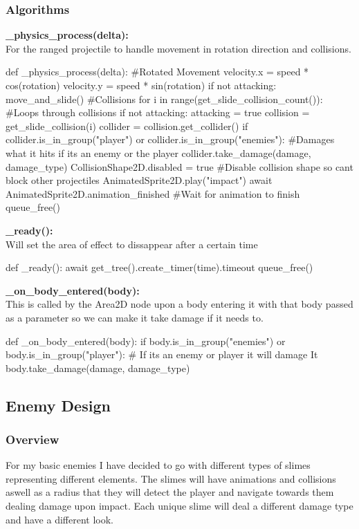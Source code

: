 \documentclass{article}
\begin{document}
        \subsubsection{Algorithms}
        \textbf{\_physics\_process(delta):}\\
        For the ranged projectile to handle movement in rotation direction and collisions.\\
        \begin{python}
def _physics_process(delta):
   #Rotated Movement
   velocity.x = speed * cos(rotation)
   velocity.y = speed * sin(rotation)
   if not attacking:
      move_and_slide()
   #Collisions
   for i in range(get_slide_collision_count()): #Loops through collisions
      if not attacking:
         attacking = true
         collision = get_slide_collision(i)
         collider = collision.get_collider()
         if collider.is_in_group("player") or collider.is_in_group("enemies"): #Damages what it hits if its an enemy or the player
            collider.take_damage(damage, damage_type) 
         CollisionShape2D.disabled = true #Disable collision shape so cant block other projectiles
         AnimatedSprite2D.play("impact")
         await AnimatedSprite2D.animation_finished #Wait for animation to finish
         queue_free()
        \end{python}
        \textbf{\_ready():}\\
        Will set the area of effect to dissappear after a certain time
        \begin{python}
def _ready():
   await get_tree().create_timer(time).timeout
   queue_free()
        \end{python}
        \textbf{\_on\_body\_entered(body):}\\
        This is called by the Area2D node upon a body entering it with that body passed as a parameter so we can make it take damage if it needs to.\\
        \begin{python}
def _on_body_entered(body):
   if body.is_in_group("enemies") or body.is_in_group("player"): # If its an enemy or player it will damage It
      body.take_damage(damage, damage_type)
        \end{python}



        \subsection{Enemy Design}
        \subsubsection{Overview}
        For my basic enemies I have decided to go with different types of slimes representing different elements. The slimes will have animations and collisions aswell as a radius that they will detect the player and navigate towards them dealing damage upon impact. Each unique slime will deal a different damage type and have a different look.\\
\end{document}
